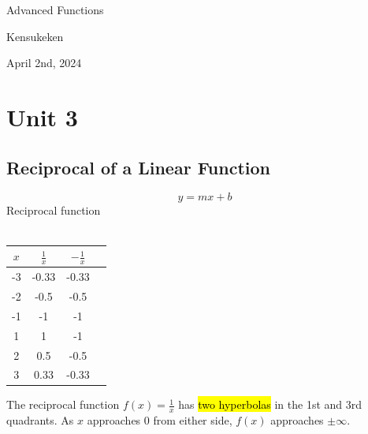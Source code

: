 \documentclass{article}
\begin{document}
\begin{titlepage}
    \centering
    \vspace*{2cm}
    {\LARGE \textcolor{lessoncolor}{Advanced Functions}}\par
    \vspace{1cm}
    {\large Kensukeken}\par
    \vspace{2cm}
    {\large April 2nd, 2024}\par
    \vspace{3cm}
\end{titlepage}
\tableofcontents
\newpage
\section{Unit 3}
\subsection{Reciprocal of a Linear Function}
$$y=mx+b$$
Reciprocal function\\\\
\begin{minipage}{0.5\textwidth}
\end{minipage}
\hspace{1cm}
\begin{minipage}{0.4\textwidth}
\centering
\begin{tabular}{|c|c|c|c|}

$x$ & $\frac{1}{x}$ & $-\frac{1}{x}$ \\ 
\hline
-3 & -0.33 & -0.33 \\
\hline
-2 & -0.5 & -0.5 \\
\hline
-1 & -1 & -1 \\
\hline
1 & 1 & -1 \\
\hline 
2 & 0.5 & -0.5 \\
\hline
3 & 0.33 & -0.33 \\

\end{tabular}
\end{minipage}
\noindent
The reciprocal function $f(x) = \frac{1}{x}$ has \hl{two hyperbolas} in the 1st and 3rd quadrants. As $x$ approaches 0 from either side, $f(x)$ approaches $\pm\infty$. 
\end{document}
